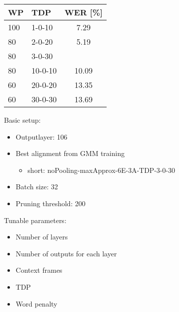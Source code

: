\documentclass[11pt, a4paper, landscape]{article}
\begin{document}
\begin{center}
	\begin{tabular}{| l | l | c |} \toprule
		WP  &  TDP      &    WER [\%]     \\ \midrule
		100 &  1-0-10   &    7.29         \\
		80  &  2-0-20   &    5.19         \\
		80  &  3-0-30   &\color{red}{4.70}\\ \midrule
		80  &  10-0-10  &    10.09        \\
		60  &  20-0-20  &    13.35        \\
		60  &  30-0-30  &    13.69        \\ \bottomrule		
	\end{tabular}
\end{center}
%
\vfill

\NewPage{}
\vfill
Basic setup:
\begin{itemize}
	\item Outputlayer: 106
	\item Best alignment from GMM training
	\begin{itemize}
		\item short: noPooling-maxApprox-6E-3A-TDP-3-0-30
	\end{itemize}
	\item Batch size: 32
	\item Pruning threshold: 200
\end{itemize}
Tunable parameters:
\begin{itemize}
	\item Number of layers
	\item Number of outputs for each layer
	\item Context frames
	\item TDP
	\item Word penalty
\end{itemize}
\vfill
\end{document}
